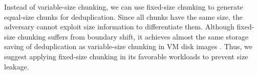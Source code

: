   
  Instead of variable-size chunking, we can use fixed-size chunking to 
 generate equal-size chunks for deduplication. Since all chunks have the same size, the adversary cannot exploit size information to differentiate them.  Although fixed-size chunking suffers from boundary shift, it achieves almost the same storage saving of deduplication as variable-size chunking in VM disk images \cite{jin09}. Thus, we suggest applying fixed-size chunking in its favorable workloads to prevent size leakage.  

      
  

  


